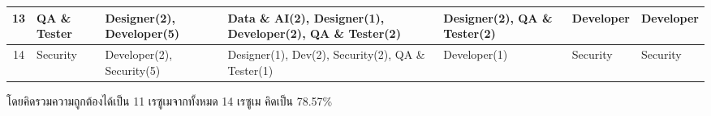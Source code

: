 \begin{table}[H]
\begin{tabularx}{\textwidth}{|c|>{\raggedright\arraybackslash}X|>{\raggedright\arraybackslash}X|>{\raggedright\arraybackslash}X|>{\raggedright\arraybackslash}X|>{\raggedright\arraybackslash}X|>{\raggedright\arraybackslash}X|}
        13                    & QA \& Tester                   & Designer(2), Developer(5)                        & Data \& AI(2), Designer(1), Developer(2), QA \& Tester(2) & Designer(2), QA \& Tester(2)       & Developer                        & Developer                              \\ \hline
        14                    & Security                       & Developer(2), Security(5)                        & Designer(1), Dev(2), Security(2), \newline QA \& Tester(1)         & Developer(1)                       & Security                         & Security                               \\ \hline
    \end{tabularx}
\end{table}
โดยคิดรวมความถูกต้องได้เป็น 11 เรซูเมจากทั้งหมด 14 เรซูเม คิดเป็น 78.57\%